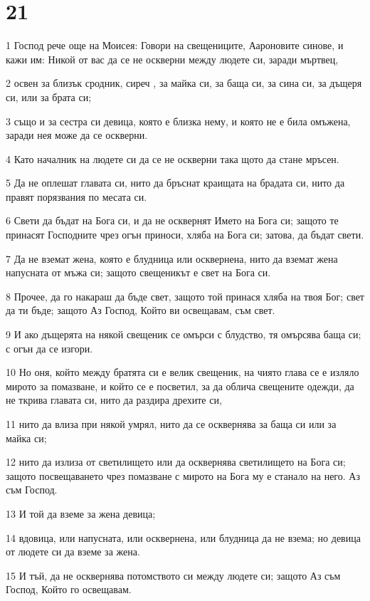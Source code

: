 \chapter{21}

\par 1 Господ рече още на Моисея: Говори на свещениците, Аароновите синове, и кажи им: Никой от вас да се не оскверни между людете си, заради мъртвец,
\par 2 освен за близък сродник, сиреч , за майка си, за баща си, за сина си, за дъщеря си, или за брата си;
\par 3 също и за сестра си девица, която е близка нему, и която не е била омъжена, заради нея може да се оскверни.
\par 4 Като началник на людете си да се не оскверни така щото да стане мръсен.
\par 5 Да не оплешат главата си, нито да бръснат краищата на брадата си, нито да правят порязвания по месата си.
\par 6 Свети да бъдат на Бога си, и да не осквернят Името на Бога си; защото те принасят Господните чрез огън приноси, хляба на Бога си; затова, да бъдат свети.
\par 7 Да не вземат жена, която е блудница или осквернена, нито да вземат жена напусната от мъжа си; защото свещеникът е свет на Бога си.
\par 8 Прочее, да го накараш да бъде свет, защото той принася хляба на твоя Бог; свет да ти бъде; защото Аз Господ, Който ви освещавам, съм свет.
\par 9 И ако дъщерята на някой свещеник се омърси с блудство, тя омърсява баща си; с огън да се изгори.
\par 10 Но оня, който между братята си е велик свещеник, на чиято глава се е изляло мирото за помазване, и който се е посветил, за да облича свещените одежди, да не ткрива главата си, нито да раздира дрехите си,
\par 11 нито да влиза при някой умрял, нито да се осквернява за баща си или за майка си;
\par 12 нито да излиза от светилището или да осквернява светилището на Бога си; защото посвещаването чрез помазване с мирото на Бога му е станало на него. Аз съм Господ.
\par 13 И той да вземе за жена девица;
\par 14 вдовица, или напусната, или осквернена, или блудница да не взема; но девица от людете си да вземе за жена.
\par 15 И тъй, да не осквернява потомството си между людете си; защото Аз съм Господ, Който го освещавам.
